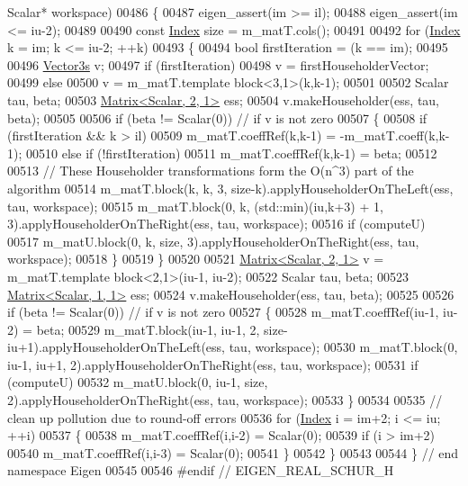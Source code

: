 \begin{DoxyCode}
       Scalar* workspace)
00486 \{
00487   eigen\_assert(im >= il);
00488   eigen\_assert(im <= iu-2);
00489 
00490   \textcolor{keyword}{const} \hyperlink{group___eigenvalues___module_a8bd4653e2d9569a44ecc95e746422d3f}{Index} size = m\_matT.cols();
00491 
00492   \textcolor{keywordflow}{for} (\hyperlink{group___eigenvalues___module_a8bd4653e2d9569a44ecc95e746422d3f}{Index} k = im; k <= iu-2; ++k)
00493   \{
00494     \textcolor{keywordtype}{bool} firstIteration = (k == im);
00495 
00496     \hyperlink{group___core___module}{Vector3s} v;
00497     \textcolor{keywordflow}{if} (firstIteration)
00498       v = firstHouseholderVector;
00499     \textcolor{keywordflow}{else}
00500       v = m\_matT.template block<3,1>(k,k-1);
00501 
00502     Scalar tau, beta;
00503     \hyperlink{group___core___module_class_eigen_1_1_matrix}{Matrix<Scalar, 2, 1>} ess;
00504     v.makeHouseholder(ess, tau, beta);
00505     
00506     \textcolor{keywordflow}{if} (beta != Scalar(0)) \textcolor{comment}{// if v is not zero}
00507     \{
00508       \textcolor{keywordflow}{if} (firstIteration && k > il)
00509         m\_matT.coeffRef(k,k-1) = -m\_matT.coeff(k,k-1);
00510       \textcolor{keywordflow}{else} \textcolor{keywordflow}{if} (!firstIteration)
00511         m\_matT.coeffRef(k,k-1) = beta;
00512 
00513       \textcolor{comment}{// These Householder transformations form the O(n^3) part of the algorithm}
00514       m\_matT.block(k, k, 3, size-k).applyHouseholderOnTheLeft(ess, tau, workspace);
00515       m\_matT.block(0, k, (std::min)(iu,k+3) + 1, 3).applyHouseholderOnTheRight(ess, tau, workspace);
00516       \textcolor{keywordflow}{if} (computeU)
00517         m\_matU.block(0, k, size, 3).applyHouseholderOnTheRight(ess, tau, workspace);
00518     \}
00519   \}
00520 
00521   \hyperlink{group___core___module_class_eigen_1_1_matrix}{Matrix<Scalar, 2, 1>} v = m\_matT.template block<2,1>(iu-1, iu-2);
00522   Scalar tau, beta;
00523   \hyperlink{group___core___module_class_eigen_1_1_matrix}{Matrix<Scalar, 1, 1>} ess;
00524   v.makeHouseholder(ess, tau, beta);
00525 
00526   \textcolor{keywordflow}{if} (beta != Scalar(0)) \textcolor{comment}{// if v is not zero}
00527   \{
00528     m\_matT.coeffRef(iu-1, iu-2) = beta;
00529     m\_matT.block(iu-1, iu-1, 2, size-iu+1).applyHouseholderOnTheLeft(ess, tau, workspace);
00530     m\_matT.block(0, iu-1, iu+1, 2).applyHouseholderOnTheRight(ess, tau, workspace);
00531     \textcolor{keywordflow}{if} (computeU)
00532       m\_matU.block(0, iu-1, size, 2).applyHouseholderOnTheRight(ess, tau, workspace);
00533   \}
00534 
00535   \textcolor{comment}{// clean up pollution due to round-off errors}
00536   \textcolor{keywordflow}{for} (\hyperlink{group___eigenvalues___module_a8bd4653e2d9569a44ecc95e746422d3f}{Index} i = im+2; i <= iu; ++i)
00537   \{
00538     m\_matT.coeffRef(i,i-2) = Scalar(0);
00539     \textcolor{keywordflow}{if} (i > im+2)
00540       m\_matT.coeffRef(i,i-3) = Scalar(0);
00541   \}
00542 \}
00543 
00544 \} \textcolor{comment}{// end namespace Eigen}
00545 
00546 \textcolor{preprocessor}{#endif // EIGEN\_REAL\_SCHUR\_H}
\end{DoxyCode}
